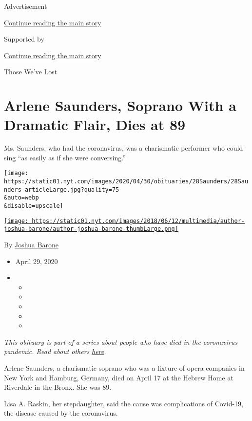 Advertisement

\protect\hyperlink{after-top}{Continue reading the main story}

Supported by

\protect\hyperlink{after-sponsor}{Continue reading the main story}

Those We've Lost

\hypertarget{arlene-saunders-soprano-with-a-dramatic-flair-dies-at-89}{%
\section{Arlene Saunders, Soprano With a Dramatic Flair, Dies at
89}\label{arlene-saunders-soprano-with-a-dramatic-flair-dies-at-89}}

Ms. Saunders, who had the coronavirus, was a charismatic performer who
could sing ``as easily as if she were conversing.''

\texttt{[image: https://static01.nyt.com/images/2020/04/30/obituaries/28Saunders/28Saunders-articleLarge.jpg?quality=75\\\&auto=webp\\\&disable=upscale]}

\href{https://www.nytimes.com/by/joshua-barone}{\texttt{[image: https://static01.nyt.com/images/2018/06/12/multimedia/author-joshua-barone/author-joshua-barone-thumbLarge.png]}}

By \href{https://www.nytimes.com/by/joshua-barone}{Joshua Barone}

\begin{itemize}
\item
  April 29, 2020
\item
  \begin{itemize}
  \item
  \item
  \item
  \item
  \item
  \end{itemize}
\end{itemize}

\emph{This obituary is part of a series about people who have died in
the coronavirus pandemic. Read about others}
\href{https://www.nytimes.com/series/people-who-have-died-of-the-coronavirus}{\emph{here}}\emph{.}

Arlene Saunders, a charismatic soprano who was a fixture of opera
companies in New York and Hamburg, Germany, died on April 17 at the
Hebrew Home at Riverdale in the Bronx. She was 89.

Lisa A. Raskin, her stepdaughter, said the cause was complications of
Covid-19, the disease caused by the coronavirus.

